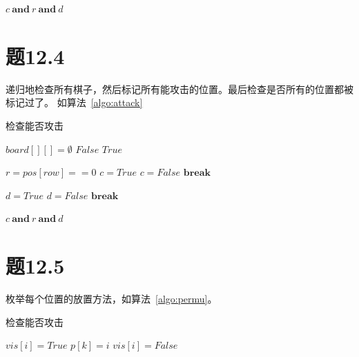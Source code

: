\documentclass[a4paper,twoside]{article}
\begin{document}
\begin{spacing}{1.2}
\begin{algorithm}[htbp]
\begin{algorithmic}[1]
			\State \Return $c \ \mathbf{and} \ r \ \mathbf{and} \ d$
		\EndProcedure
	\end{algorithmic}
\end{algorithm}	

\section{题12.4}

递归地检查所有棋子，然后标记所有能攻击的位置。最后检查是否所有的位置都被标记过了。
如算法~\ref{algo:attack}
\begin{algorithm}[htbp]
	\caption{检查能否攻击}
	\label{algo:attack}
	\begin{algorithmic}[1]
			\State $board[][]=\emptyset$
			\State {}
						\State \Return $False$
					\EndIf
				\EndFor
			\EndFor
			\State \Return $True$
		\EndProcedure

			\State $r=pos[row]==0$	
			\State $c=True$
					\State $c=False$
					\State $\mathbf{break}$
				\EndIf
			\EndFor	

			\State $d=True$
							\State $d=False$
							\State $\mathbf{break}$
						\EndIf
					\EndIf
				\EndFor
			\EndFor

			\State \Return $c \ \mathbf{and} \ r \ \mathbf{and} \ d$
		\EndProcedure
	\end{algorithmic}
\end{algorithm}	

\section{题12.5}

枚举每个位置的放置方法，如算法~\ref{algo:permu}。
\begin{algorithm}[htbp]
	\caption{检查能否攻击}
	\label{algo:attack}
	\begin{algorithmic}[1]
				\State {}
			\EndIf
					\State $vis[i]=True$
					\State $p[k]=i$
					\State {}
					\State $vis[i]=False$
				\EndIf
			\EndFor
		\EndProcedure
	\end{algorithmic}
\end{algorithm}	

\end{spacing}
\end{document}
